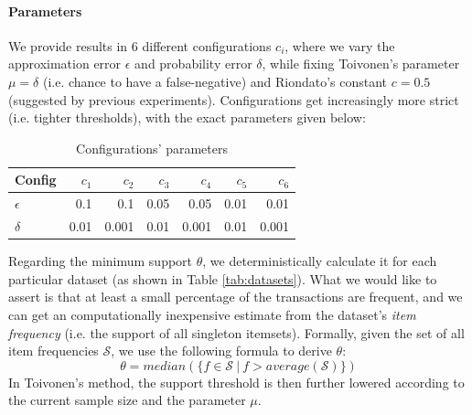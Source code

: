 \documentclass[11pt]{sigplanconf}
\renewcommand\it{\textit}
\renewcommand\S{\mathcal{S}}
\begin{document}
\paragraph{Parameters} We provide results in 6 different configurations $c_i$, where we vary the approximation error $\epsilon$ and probability error $\delta$, while fixing Toivonen's parameter $\mu=\delta$ (i.e. chance to have a false-negative) and Riondato's constant $c=0.5$ (suggested by previous experiments). Configurations get increasingly more strict (i.e. tighter thresholds), with the exact parameters given below:
\begin{table}[h!]
  \begin{center}
    \begin{tabular}{l|rrrrrr}
      \hline
      Config & $c_1$ & $c_2$ & $c_3$ & $c_4$ & $c_5$ & $c_6$\\
      \hline
      $\epsilon$ & 0.1 & 0.1 & 0.05 & 0.05 & 0.01 & 0.01\\
      $\delta$ & 0.01 & 0.001 & 0.01 & 0.001 & 0.01 & 0.001\\
      \hline
    \end{tabular}
    \caption{Configurations' parameters}
    \label{tab:config}
  \end{center}
\end{table}

Regarding the minimum support $\theta$, we deterministically calculate it for each particular dataset (as shown in Table \ref{tab:datasets}). What we would like to assert is that at least a small percentage of the transactions are frequent, and we can get an computationally inexpensive estimate from the dataset's \it{item frequency} (i.e. the support of all singleton itemsets). Formally, given the set of all item frequencies $\S$, we use the following formula to derive $\theta$:
\[ \theta = median(\{ f \in \S \ | \ f > average(\S) \})
\]
In Toivonen's method, the support threshold is then further lowered according to the current sample size and the parameter $\mu$.
\end{document}
